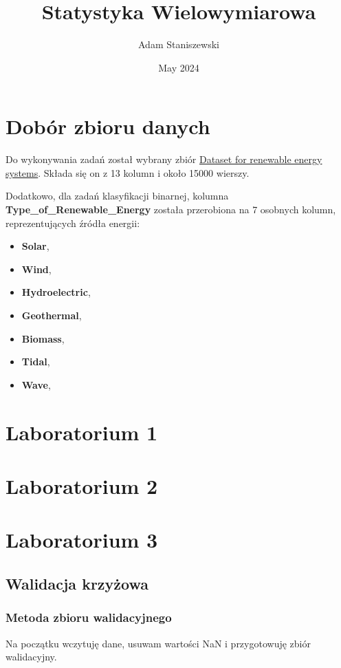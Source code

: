 \documentclass{article}
\title{Statystyka Wielowymiarowa}
\author{Adam Staniszewski}
\date{May 2024}
\begin{document}
\maketitle

\tableofcontents  %

\section{Dobór zbioru danych}
Do wykonywania zadań został wybrany zbiór \href{https://www.kaggle.com/datasets/girumwondemagegn/dataset-for-renewable-energy-systems}{Dataset for renewable energy systems}. Składa się on z 13 kolumn i około 15000 wierszy. 

Dodatkowo, dla zadań klasyfikacji binarnej, kolumna \textbf{Type\_of\_Renewable\_Energy} została przerobiona na 7 osobnych kolumn, reprezentujących źródła energii:
\begin{itemize}
    \item \textbf{Solar},
    \item \textbf{Wind},
    \item \textbf{Hydroelectric},
    \item \textbf{Geothermal},
    \item \textbf{Biomass},
    \item \textbf{Tidal},
    \item \textbf{Wave},
\end{itemize}

\section{Laboratorium 1}


\section{Laboratorium 2}


\section{Laboratorium 3}
\subsection{Walidacja krzyżowa}
\subsubsection{Metoda zbioru walidacyjnego}
Na początku wczytuję dane, usuwam wartości NaN i przygotowuję zbiór walidacyjny.
\end{document}
